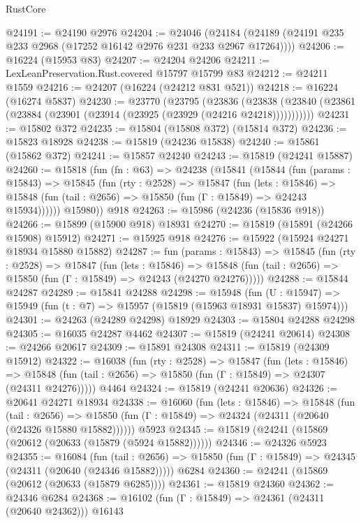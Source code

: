 \begin{lexlean}{RustCore}
\begin{coremodule}
@24191 := @24190 @2976
@24204 := @24046
    (@24184 (@24189 (@24191 @235 @233 @2968 (@17252 @16142 @2976 @231 @233 @2967 @17264))))
@24206 := @16224 (@15953 @83)
@24207 := @24204 @24206
@24211 := LexLeanPreservation.Rust.covered @15797 @15799 @83
@24212 := @24211 @1559
@24216 := @24207 (@16224 (@24212 @831 @521))
@24218 := @16224 (@16274 @5837)
@24230 := @23770
    (@23795
      (@23836
        (@23838 (@23840 (@23861 (@23884 (@23901 (@23914 (@23925 (@23929 (@24216 @24218)))))))))))
@24231 := @15802 @372
@24235 := @15804 (@15808 @372) (@15814 @372)
@24236 := @15823 @18928
@24238 := @15819 (@24236 @15838)
@24240 := @15861 (@15862 @372)
@24241 := @15857 @24240
@24243 := @15819 (@24241 @15887)
@24260 := @15818
    (fun (fn : @63) =>
    @24238
      (@15841
        (@15844
          (fun (params : @15843) =>
          @15845
            (fun (rty : @2528) =>
            @15847
              (fun (lets : @15846) =>
              @15848 (fun (tail : @2656) => @15850 (fun (Γ : @15849) => @24243 @15934))))))
        @15980))
    @918
@24263 := @15986 (@24236 (@15836 @918))
@24266 := @15899 (@15900 @918) @18931
@24270 := @15819 (@15891 (@24266 @15908) @15912)
@24271 := @15925 @918
@24276 := @15922 (@15924 @24271 @18934 @15880 @15882)
@24287 := fun (params : @15843) =>
  @15845
    (fun (rty : @2528) =>
    @15847
      (fun (lets : @15846) =>
      @15848 (fun (tail : @2656) => @15850 (fun (Γ : @15849) => @24243 (@24270 @24276)))))
@24288 := @15844 @24287
@24289 := @15841 @24288
@24298 := @15948
    (fun (U : @15947) => @15949 (fun (t : @7) => @15957 (@15819 (@15963 @18931 @15837) @15974)))
@24301 := @24263 (@24289 @24298) @18929
@24303 := @15804 @24288 @24298
@24305 := @16035 @24287 @4462
@24307 := @15819 (@24241 @20614)
@24308 := @24266 @20617
@24309 := @15891 @24308
@24311 := @15819 (@24309 @15912)
@24322 := @16038
    (fun (rty : @2528) =>
    @15847
      (fun (lets : @15846) =>
      @15848 (fun (tail : @2656) => @15850 (fun (Γ : @15849) => @24307 (@24311 @24276)))))
    @4464
@24324 := @15819 (@24241 @20636)
@24326 := @20641 @24271 @18934
@24338 := @16060
    (fun (lets : @15846) =>
    @15848
      (fun (tail : @2656) =>
      @15850 (fun (Γ : @15849) => @24324 (@24311 (@20640 (@24326 @15880 @15882))))))
    @5923
@24345 := @15819 (@24241 (@15869 (@20612 (@20633 (@15879 (@5924 @15882))))))
@24346 := @24326 @5923
@24355 := @16084
    (fun (tail : @2656) => @15850 (fun (Γ : @15849) => @24345 (@24311 (@20640 (@24346 @15882)))))
    @6284
@24360 := @24241 (@15869 (@20612 (@20633 (@15879 @6285))))
@24361 := @15819 @24360
@24362 := @24346 @6284
@24368 := @16102 (fun (Γ : @15849) => @24361 (@24311 (@20640 @24362))) @16143

\end{coremodule}
\end{lexlean}
